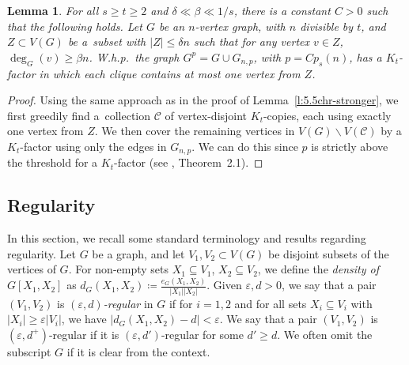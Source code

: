 \documentclass[reqno, 12pt]{amsart}
\numberwithin{equation}{section}
\numberwithin{figure}{section}
\theoremstyle{plain}
\newtheorem{lemma}[thm]{Lemma}
\theoremstyle{definition}
\let\eps=\varepsilon
\def\cC{{\mathcal C}}
\def \Gnp{G_{n,p}}
\let\setminus=\smallsetminus
\begin{document}
    \begin{lemma}\label{l:Z-conf.-Kt-factor}
        For all $s\geq t\geq 2$ and $\delta \ll \beta \ll 1/s$, there is a constant $C>0$ such that the following holds. Let $G$ be an $n$-vertex graph, with $n$ divisible by $t$, and $Z\subset V(G)$ be a~subset with $|Z| \leq \delta n$ such that for any vertex $v\in Z$, $\deg_G(v) \geq \beta n$. W.h.p.~the graph $G^p=G\cup \Gnp$, with $p=Cp_s(n)$, has a $K_t$-factor in which each clique contains at most one vertex from $Z$.
    \end{lemma}

    \begin{proof}
        Using the same approach as in the proof of Lemma~\ref{l:5.5chr-stronger}, we first greedily find a~collection $\cC$ of vertex-disjoint $K_t$-copies, each using exactly one vertex from $Z$. We then cover the remaining vertices in $V(G)\setminus V(\cC)$ by a $K_t$-factor using only the edges in $\Gnp$. We can do this since $p$ is strictly above the threshold for a $K_t$-factor (see \cite{jkv08}, Theorem~2.1).
    \end{proof}	
	

    \subsection{Regularity}\label{sec:prelim-reg}
	

    In this section, we recall some standard terminology and results regarding regularity.  
    Let $G$ be a graph, and let $V_1, V_2 \subset V(G)$ be disjoint subsets of the vertices of $G$. For non-empty sets $X_1\subseteq V_1$, $X_2 \subseteq V_2$, we define the \emph{density of $G[X_1,X_2]$} as $d_G(X_1, X_2)\coloneq \tfrac{e_G(X_1,X_2)}{|X_1||X_2|}$.
    Given $\eps, d > 0$, we say that a pair $(V_1,V_2)$ is \emph{$(\eps,d)$-regular} in $G$ if for $i = 1,2$ and for all sets $X_i \subseteq V_i$  with $|X_i|\geq \eps |V_i|$, we have $| d_G(X_1,X_2)-d| < \eps$. We say that a pair $(V_1,V_2)$ is $(\eps,d^+)$-regular if it is $(\eps,d')$-regular for some $d'\geq d$. We often omit the subscript $G$ if it is clear from the context.
\end{document}
